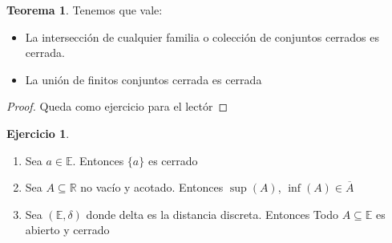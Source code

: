 \documentclass[12pt]{article}
\newcommand{\R}{\mathbb{R}}
\newcommand{\E}{\mathbb{E}}
\newcommand{\ol}{\overline}
\theoremstyle{definition}
\newtheorem{theorem}{Teorema}
\newtheorem{ej}{Ejercicio}
\begin{document}
\begin{theorem} Tenemos que vale:

  \begin{itemize}
    \item La intersección de cualquier familia o colección de conjuntos cerrados es cerrada.

    \item La unión de finitos conjuntos cerrada es cerrada

    \end{itemize}

    \begin{proof}
      Queda como ejercicio para el lectór
    \end{proof}
\end{theorem}

\begin{ej}
  \begin{enumerate}
    \item Sea $a \in \E$. Entonces $\{a\}$ es cerrado
    \item Sea $A \subseteq \R$ no vacío y acotado. Entonces $\sup(A)$, $\inf(A) \in \ol A$
    \item Sea $(\E,\delta)$ donde delta es la distancia discreta. Entonces Todo $A \subseteq \E$ es abierto y cerrado
    \end{enumerate}

\end{ej}
\end{document}
